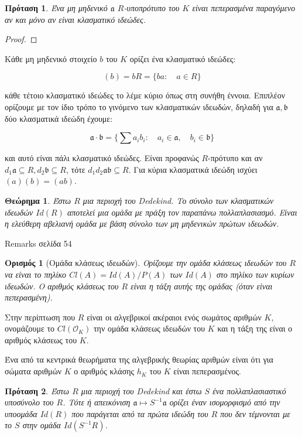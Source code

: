 \documentclass[oneside,a4paper]{article}
\newtheorem{theorem}{Θεώρημα}
\newtheorem*{defn}{Ορισμός}
\newtheorem{prop}{Πρόταση}
\newcommand {\tl}{\textlatin}
\begin{document}
\begin{prop}
	Ένα μη μηδενικό $\mathfrak{a}$ $R$-υποπρότυπο του $K$ είναι πεπερασμένα παραγόμενο αν και μόνο αν είναι κλασματικό ιδεώδες.
\end{prop}

\begin{proof}
\end{proof}


Κάθε μη μηδενικό στοιχείο $b$ του $K$ ορίζει ένα κλασματικό ιδεώδες:

$$(b) = bR = \{ba: \quad a \in R\}$$

κάθε τέτοιο κλασματικό ιδεώδες το λέμε κύριο όπως στη συνήθη έννοια. Επιπλέον ορίζουμε με τον ίδιο τρόπο το γινόμενο των κλασματικών ιδεωδών, δηλαδή για $\mathfrak{a},\mathfrak{b}$ δύο κλασματικά ιδεώδη έχουμε:

$$\mathfrak{a} \cdot \mathfrak{b} = \{\sum a_i b_i : \quad a_i \in \mathfrak{a}, \quad b_i \in \mathfrak{b} \}$$

και αυτό είναι πάλι κλασματικό ιδεώδες. Είναι προφανώς $R$-πρότυπο και αν $d_1 \mathfrak{a} \subseteq R, d_2 \mathfrak{b} \subseteq R$, τότε $d_1d_2 \mathfrak{a}\mathfrak{b} \subseteq R$. Για κύρια κλασματικά ιδεώδη ισχύει $(a)(b) = (ab)$.


\begin{theorem} Έστω $R$ μια περιοχή του \tl{Dedekind}. Το σύνολο των κλασματικών ιδεωδών $Id(R)$ αποτελεί μια ομάδα με πράξη τον παραπάνω πολλαπλασιασμό. Είναι η ελεύθερη αβελιανή ομάδα με βάση σύνολο των μη μηδενικών πρώτων ιδεωδών.
\end{theorem}

\tl{Remarks} σελίδα 54




\begin{defn}[Ομάδα κλάσεως ιδεωδών]
	Ορίζουμε την ομάδα κλάσεως ιδεωδών του $R$ να είναι το πηλίκο $Cl(A) = Id(A)/P(A)$ των $Id(A)$ στο πηλίκο των κυρίων ιδεωδών. Ο αριθμός κλάσεως του $R$ είναι η τάξη αυτής της ομάδας (όταν είναι πεπερασμένη).
\end{defn}

Στην περίπτωση που $R$ είναι οι αλγεβρικοί ακέραιοι ενός σωμάτος αριθμών $K$, ονομάζουμε το $Cl(\mathcal{O}_K)$ την ομάδα κλάσεως ιδεωδών του $K$ και η τάξη της είναι ο αριθμός κλάσεως του $K$.

Ένα από τα κεντρικά θεωρήματα της αλγεβρικής θεωρίας αριθμών είναι ότι για σώματα αριθμών $K$ ο αριθμός κλάσης $h_K$ του $K$ είναι πεπερασμένος.


\begin{prop}Έστω $R$ μια περιοχή του \tl{Dedekind} και έστω $S$ ένα πολλαπλασιαστικό υποσύνολο του $R$. Τότε ή απεικόνιση $\mathfrak{a} \mapsto S^{-1}\mathfrak{a}$ ορίζει έναν ισομορφισμό από την υποομάδα $Id(R)$ που παράγεται από τα πρώτα ιδεώδη του $R$ που δεν τέμνονται με το $S$ στην ομάδα $Id(S^{-1}R)$.
\end{prop}
\end{document}

